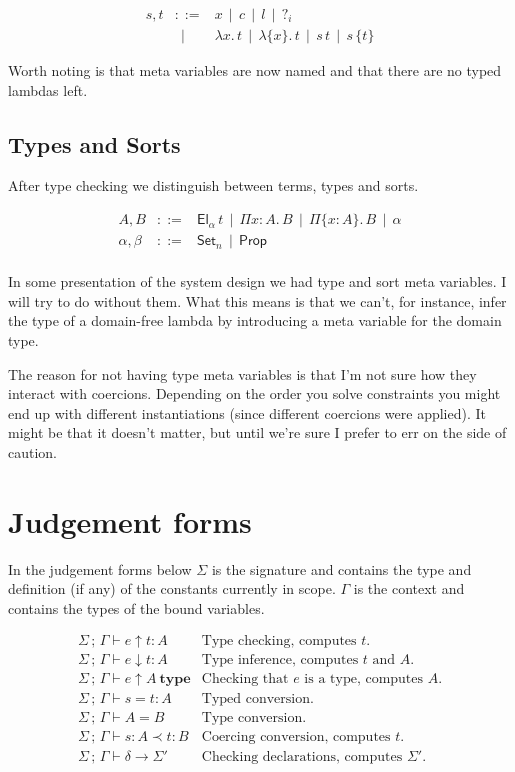 \documentclass[a4paper,11pt]{article}
\newcommand\Coloneqq{\mathrel{::=}}
\newcommand\OR{~~|~~}
\newcommand\Hid[1]{\{#1\}}
\newcommand\lam[1]{\lambda#1.\,}
\newcommand\hlam[1]{\lam{\Hid{#1}}}
\newcommand\vPi[2]{\Pi#1:#2.\,}
\newcommand\vhPi[2]{\Pi\{#1:#2\}.\,}
\newcommand\Set[1]{\mathsf{Set}_{#1}}
\newcommand\Prop{\mathsf{Prop}}
\newcommand\el{\mathsf{El}}
\newcommand\El[1]{\el_{#1}\,}
\renewcommand\Check[5]{#1\,;\,#2\vdash#3\uparrow#4:#5}
\newcommand\Infer[5]{#1\,;\,#2\vdash#3\downarrow#4:#5}
\newcommand\IsType[4]{#1\,;\,#2\vdash#3\uparrow#4~\mathbf{type}}
\newcommand\Equal[5]{#1\,;\,#2\vdash#3=#4:#5}
\newcommand\TEqual[4]{#1\,;\,#2\vdash#3=#4}
\newcommand\Expand[6]{#1\,;\,#2\vdash#3:#4\prec#5:#6}
\newcommand\CheckDecl[4]{#1\,;\,#2\vdash#3\to#4}
\begin{document}
    \[\begin{array}{lcl}
	s,t & \Coloneqq & x \OR c \OR l \OR ?_i \\
	    & \OR & \lam xt \OR \hlam xt \OR s\,t \OR s\,\Hid t
    \end{array}\]

    Worth noting is that meta variables are now named and that there are no
    typed lambdas left.

\subsection{Types and Sorts}

    After type checking we distinguish between terms, types and sorts.

    \[\begin{array}{lcl}
	A,B & \Coloneqq & \El\alpha t \OR \vPi xAB \OR \vhPi xAB \OR \alpha \\
	\alpha,\beta & \Coloneqq & \Set n \OR \Prop \\
    \end{array}\]

    In some presentation of the system design we had type and sort meta
    variables. I will try to do without them. What this means is that we can't,
    for instance, infer the type of a domain-free lambda by introducing a meta
    variable for the domain type.

    The reason for not having type meta variables is that I'm not sure how they
    interact with coercions.  Depending on the order you solve constraints you
    might end up with different instantiations (since different coercions were
    applied).  It might be that it doesn't matter, but until we're sure I
    prefer to err on the side of caution.

\section{Judgement forms}

    In the judgement forms below $\Sigma$ is the signature and contains the
    type and definition (if any) of the constants currently in scope. $\Gamma$
    is the context and contains the types of the bound variables.

    \[\begin{array}{ll}
	\Check\Sigma\Gamma etA	    & \mbox{Type checking, computes $t$.} \\
	\Infer\Sigma\Gamma etA	    & \mbox{Type inference, computes $t$ and $A$.} \\
	\IsType\Sigma\Gamma eA	    & \mbox{Checking that $e$ is a type, computes $A$.} \\
	\Equal\Sigma\Gamma stA	    & \mbox{Typed conversion.} \\
	\TEqual\Sigma\Gamma AB	    & \mbox{Type conversion.} \\
	\Expand\Sigma\Gamma sAtB    & \mbox{Coercing conversion, computes $t$.} \\
	\CheckDecl\Sigma\Gamma\delta{\Sigma'} & \mbox{Checking declarations, computes $\Sigma'$.}
    \end{array}\]
\end{document}
